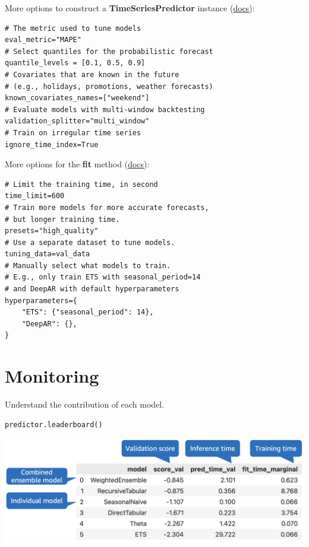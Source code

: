 More options to construct a \textbf{TimeSeriesPredictor} instance (\href{https://auto.gluon.ai/stable/api/autogluon.predictor.html#module-5}{docs}):

\begin{verbatim}
# The metric used to tune models
eval_metric="MAPE"
# Select quantiles for the probabilistic forecast
quantile_levels = [0.1, 0.5, 0.9]
# Covariates that are known in the future
# (e.g., holidays, promotions, weather forecasts)
known_covariates_names=["weekend"]
# Evaluate models with multi-window backtesting
validation_splitter="multi_window"
# Train on irregular time series
ignore_time_index=True
\end{verbatim}
More options for the \textbf{fit} method (\href{https://auto.gluon.ai/stable/api/autogluon.predictor.html#autogluon.timeseries.TimeSeriesPredictor.fit}{docs}):

\begin{verbatim}
# Limit the training time, in second
time_limit=600
# Train more models for more accurate forecasts, 
# but longer training time.
presets="high_quality"
# Use a separate dataset to tune models.
tuning_data=val_data
# Manually select what models to train.
# E.g., only train ETS with seasonal_period=14
# and DeepAR with default hyperparameters
hyperparameters={
    "ETS": {"seasonal_period": 14},
    "DeepAR": {},
}
\end{verbatim}



\section*{Monitoring}
Understand the contribution of each model.

\begin{verbatim}
predictor.leaderboard()
\end{verbatim}

\includegraphics[width=\linewidth]{timeseries/images/leaderboard.png}

